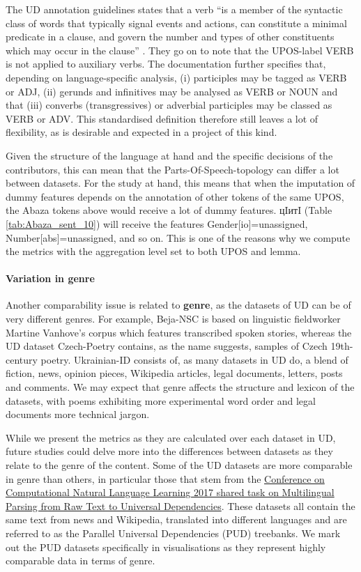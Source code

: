 \documentclass[USenglish]{article}
\begin{document}
The UD annotation guidelines states that a verb ``is a member of the syntactic class of words that typically signal events and actions, can constitute a minimal predicate in a clause, and govern the number and types of other constituents which may occur in the clause'' \citep{ud_2_VERB_website}. 
They go on to note that the UPOS-label VERB is not applied to auxiliary verbs. 
The documentation further specifies that, depending on language-specific analysis, (i) participles may be tagged as VERB or ADJ, (ii) gerunds and infinitives may be analysed as VERB or NOUN and that (iii) converbs (transgressives) or adverbial participles may be classed as VERB or ADV.
This standardised definition therefore still leaves a lot of flexibility, as is desirable and expected in a project of this kind.

Given the structure of the language at hand and the specific decisions of the contributors, this can mean that the Parts-Of-Speech-topology can differ a lot between datasets. 
For the study at hand, this means that when the imputation of dummy features depends on the annotation of other tokens of the same UPOS, the Abaza tokens above would receive a lot of dummy features. 
{\Timesfont цIитI} (Table \ref{tab:Abaza_sent_10}) will receive the features Gender[io]=unassigned, Number[abs]=unassigned, and so on.
This is one of the reasons why we compute the metrics with the aggregation level set to both UPOS and lemma.

\paragraph{Variation in genre}
\label{sec:caveat_genres}
Another comparability issue is related to \textbf{genre}, as the datasets of UD can be of very different genres. 
For example, Beja-NSC is based on linguistic fieldworker Martine Vanhove's corpus which features transcribed spoken stories, whereas the UD dataset Czech-Poetry contains, as the name suggests, samples of Czech 19th-century poetry. 
Ukrainian-ID consists of, as many datasets in UD do, a blend of fiction, news, opinion pieces, Wikipedia articles, legal documents, letters, posts and comments. 
We may expect that genre affects the structure and lexicon of the datasets, with poems exhibiting more experimental word order and legal documents more technical jargon. 

While we present the metrics as they are calculated over each dataset in UD, future studies could delve more into the differences between datasets as they relate to the genre of the content.
Some of the UD datasets are more comparable in genre than others, in particular those that stem from the \hyperlink{http://universaldependencies.org/conll17/}{Conference on Computational Natural Language Learning 2017 shared task on Multilingual Parsing from Raw Text to Universal Dependencies}.
These datasets all contain the same text from news and Wikipedia, translated into different languages and are referred to as the Parallel Universal Dependencies (PUD) treebanks.
We mark out the PUD datasets specifically in visualisations as they represent highly comparable data in terms of genre.
\end{document}
